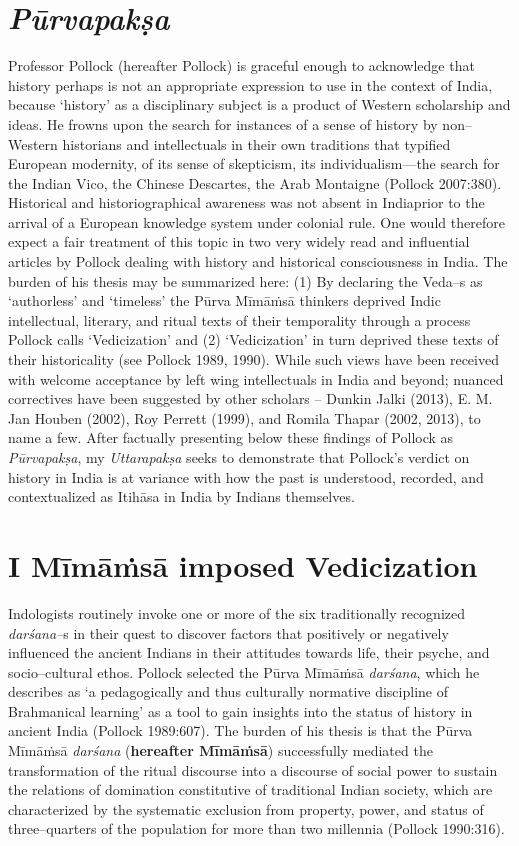 \section*{\textit{Pūrvapakṣa}}

Professor Pollock (hereafter Pollock) is graceful enough to acknowledge that history perhaps is not an appropriate expression to use in the context of India, because ‘history’ as a disciplinary subject is a product of Western scholarship and ideas. He frowns upon the search for instances of a sense of history by non–Western historians and intellectuals in their own traditions that typified European modernity, of its sense of skepticism, its individualism—the search for the Indian Vico, the Chinese Descartes, the Arab Montaigne (Pollock 2007:380). Historical and historiographical awareness was not absent in India\break prior to the arrival of a European knowledge system under colonial rule. One would therefore expect a fair treatment of this topic in two very widely read and influential articles by Pollock dealing with history and historical consciousness in India. The burden of his thesis may be summarized here: (1) By declaring the Veda–s as ‘authorless’ and ‘timeless’ the Pūrva Mīmāṁsā thinkers deprived Indic intellectual, literary, and ritual texts of their temporality through a process Pollock calls ‘Vedicization’ and (2) ‘Vedicization’ in turn deprived these texts of their historicality (see Pollock 1989, 1990). While such views have been received with welcome acceptance by left wing intellectuals in India and beyond; nuanced correctives have been suggested by other scholars – Dunkin Jalki (2013), E. M. Jan Houben (2002), Roy Perrett (1999), and Romila Thapar (2002, 2013), to name a few. After factually presenting below these findings of Pollock as \textit{Pūrvapakṣa}, my \textit{Uttarapakṣa} seeks to demonstrate that Pollock’s verdict on history in India is at variance with how the past is understood, recorded, and contextualized as Itihāsa in India by Indians themselves.


\section*{I Mīmāṁsā imposed Vedicization}

Indologists routinely invoke one or more of the six traditionally recognized \textit{darśana–}s in their quest to discover factors that positively or negatively influenced the ancient Indians in their attitudes towards life, their psyche, and socio–cultural ethos. Pollock selected the Pūrva Mīmāṁsā \textit{darśana}, which he describes as ‘a pedagogically and thus culturally normative discipline of Brahmanical learning’ as a tool to gain insights into the status of history in ancient India (Pollock 1989:607). The burden of his thesis is that the Pūrva Mīmāṁsā \textit{darśana} (\textbf{hereafter Mīmāṁsā}) successfully mediated the transformation of the ritual discourse into a discourse of social power to sustain the relations of domination constitutive of traditional Indian society, which are characterized by the systematic exclusion from property, power, and status of three–quarters of the population for more than two millennia (Pollock 1990:316).

